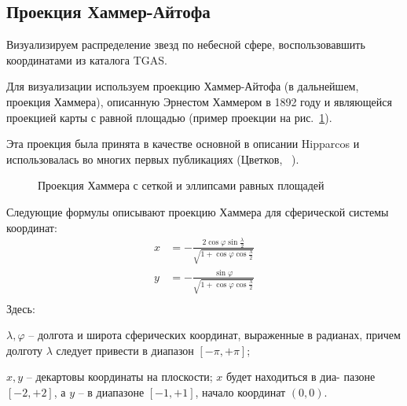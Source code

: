 \documentclass[14pt]{article} %
\begin{document}
\subsection{Проекция Хаммер-Айтофа}\label{sub:hammer}

Визуализируем распределение звезд по небесной сфере, воспользовавшить координатами из каталога TGAS. 

Для визуализации используем проекцию Хаммер-Айтофа (в дальнейшем, проекция Хаммера), описанную Эрнестом Хаммером в 1892 году и являющейся проекцией карты с равной площадью (пример проекции на рис.~\ref{img:hammtiss}).

Эта проекция была принята в качестве основной в описании Hipparcos и использовалась во многих первых публикациях (Цветков, ~\cite{book:hipparcos}).

\begin{figure}[h!]
\caption{Проекция Хаммера с сеткой и эллипсами равных площадей}
\label{img:hammtiss}
\end{figure}

Следующие формулы описывают проекцию Хаммера для
сферической системы координат:
\begin{equation*}
\begin{array}{cl}
x&=-\frac{2  \cos \varphi \sin \frac{\lambda}{2}}{\sqrt{1 + \cos \varphi \cos \frac{\lambda}{2}}}\\
y&=-\frac{\sin \varphi}{\sqrt{1 + \cos \varphi \cos \frac{\lambda}{2}}}\\
\end{array}
\end{equation*}
Здесь:

$\lambda, \varphi$ – долгота и широта сферических координат, выраженные в радианах, причем долготу $\lambda$ следует привести в диапазон $\left[ -\pi,+\pi\right]$;

$x, y$ – декартовы координаты на плоскости; $x$ будет находиться в диа-
пазоне $\left[-2, +2\right]$, а $y$ – в диапазоне $\left[-1, +1\right]$, начало координат $(0, 0)$.
\end{document}
